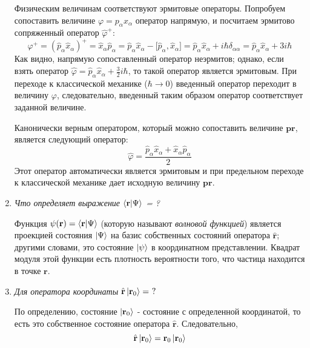 \documentclass{article}
\begin{document}
\begin{enumerate}
	Физическим величинам соответствуют эрмитовые операторы. Попробуем сопоставить величине $\varphi = p_\alpha x_\alpha$ оператор напрямую, и посчитаем эрмитово сопряженный оператор $\hat{\varphi}^+$:
	\begin{equation}
		\varphi^+ = (\hat{p}_\alpha \hat{x}_\alpha)^+ = \hat{x}_\alpha \hat{p}_\alpha = \hat{p}_\alpha \hat{x}_\alpha - \big[\hat{p}_\alpha, \hat{x}_\alpha \big] = \hat{p}_\alpha \hat{x}_\alpha + i\hbar \delta_{\alpha\alpha} = \hat{p}_\alpha \hat{x}_\alpha + 3i\hbar
	\end{equation}
	Как видно, напрямую сопоставленный оператор неэрмитов; однако, если взять оператор $\hat{\varphi} = \hat{p}_\alpha \hat{x}_\alpha + \frac{3}{2}i\hbar$, то такой оператор является эрмитовым. При переходе к классической механике ($\hbar \to 0$) введенный оператор переходит в величину $\varphi$, следовательно, введенный таким образом оператор соответствует заданной величине.
	
	Канонически верным оператором, который можно сопоставить величине $\textbf{pr}$, является следующий оператор:
	\begin{equation}
		\hat{\varphi} = \frac{\hat{p}_\alpha \hat{x}_\alpha + \hat{x}_\alpha \hat{p}_\alpha}{2}
	\end{equation}
	Этот оператор автоматически является эрмитовым и при предельном переходе к классической механике дает исходную величину $\textbf{pr}$.
	
	\item \textit{Что определяет выражение }$\braket{\textbf{r}|\Psi}$\textit{ = ?}
	
	Функция $\psi(\textbf{r}) = \braket{\textbf{r}|\Psi}$ (которую называют \textit{волновой функцией}) является проекцией состояния $\ket{\Psi}$ на базис собственных состояний оператора $\hat{\textbf{r}}$; другими словами, это состояние $\ket{\psi}$ в координатном представлении. Квадрат модуля этой функции есть плотность вероятности того, что частица находится в точке $\textbf{r}$.
	
	\item \textit{Для оператора координаты $\hat{\textbf{r} } \ket{\textbf{r}_0} = \ ?$}
	
	По определению, состояние $\ket{\textbf{r}_0}$ - состояние с определенной координатой, то есть это собственное состояние оператора $\hat{\textbf{r}}$. Следовательно,
	\begin{equation}
		\hat{\textbf{r}}\ket{\textbf{r}_0} = \textbf{r}_0 \ket{\textbf{r}_0}
	\end{equation}
	

\end{enumerate}
\end{document}
